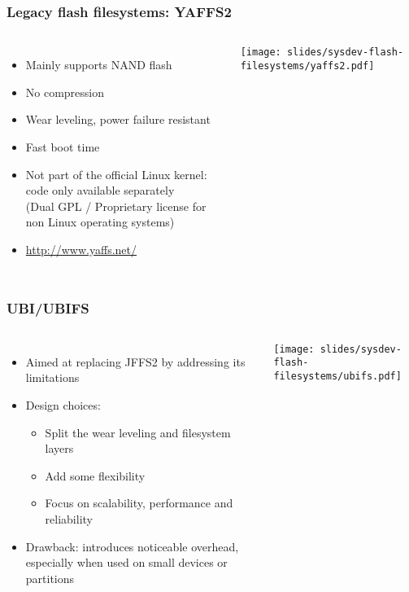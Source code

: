 \begin{frame}
  \frametitle{Legacy flash filesystems: YAFFS2}
  \begin{columns}
    \begin{itemize}
    \item Mainly supports NAND flash
    \item No compression
    \item Wear leveling, power failure resistant
    \item Fast boot time
    \item Not part of the official Linux kernel: code only available
      separately\\
      (Dual GPL / Proprietary license for non Linux operating systems)
    \item \url{http://www.yaffs.net/}
    \end{itemize}
    \texttt{[image: slides/sysdev-flash-filesystems/yaffs2.pdf]}
  \end{columns}
\end{frame}


\begin{frame}
  \frametitle{UBI/UBIFS}
  \begin{columns}
    \begin{itemize}
    \item Aimed at replacing JFFS2 by addressing its limitations
    \item Design choices:
      \begin{itemize}
      \item Split the wear leveling and filesystem layers
      \item Add some flexibility
      \item Focus on scalability, performance and reliability
      \end{itemize}
    \item Drawback: introduces noticeable overhead, especially when
      used on small devices or partitions
    \end{itemize}
    \texttt{[image: slides/sysdev-flash-filesystems/ubifs.pdf]}
  \end{columns}
\end{frame}

